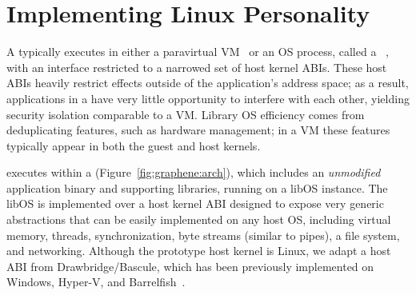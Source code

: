 \section{Implementing Linux Personality}
\label{sec:graphene:background}

A \libos{} typically executes in either a paravirtual VM~\citep{unikernels,osv}
or an OS process, called a {\em \picoproc{}}~\citep{porter11drawbridge,baumann13bascule},
with an interface restricted to a narrowed set of host kernel ABIs.
These host ABIs heavily restrict effects outside of the application's address space;
as a result, applications in a \picoproc{} have very little opportunity to interfere with each other,
yielding security isolation comparable to a VM.
Library OS efficiency comes from deduplicating features, such as hardware management;
in a VM these features typically appear in both the guest and host kernels.


\sysname{} executes within a \picoproc{} (Figure~\ref{fig:graphene:arch}),
which includes an {\em unmodified} application binary and supporting libraries, 
running on a libOS instance.
The libOS is implemented over a host kernel ABI
designed to expose very generic abstractions that can be easily 
implemented on any host OS, including virtual memory, threads, synchronization, byte streams (similar to pipes),
a file system, and networking.
Although the \sysname{} prototype  host kernel is Linux, 
we adapt a host ABI from Drawbridge/Bascule,
which has been previously implemented on Windows, Hyper-V, and Barrelfish~\citep{porter11drawbridge,baumann13bascule,baumann09barrelfish}.


